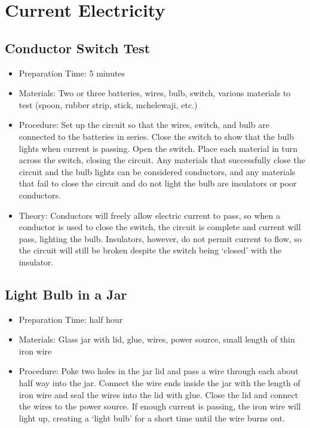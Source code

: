 \section{Current Electricity}

\subsection{Conductor Switch Test}
\begin{itemize}
\item{Preparation Time: 5 minutes}
\item{Materials: Two or three batteries, wires, bulb, switch, various materials to test (spoon, rubber strip, stick, mchelewaji, etc.)}
\item{Procedure: Set up the circuit so that the wires, switch, and bulb are connected to the batteries in series. Close the switch to show that the bulb lights when current is passing. Open the switch. Place each material in turn across the switch, closing the circuit. Any materials that successfully close the circuit and the bulb lights can be considered conductors, and any materials that fail to close the circuit and do not light the bulb are insulators or poor conductors.}
\item{Theory: Conductors will freely allow electric current to pass, so when a conductor is used to close the switch, the circuit is complete and current will pass, lighting the bulb. Insulators, however, do not permit current to flow, so the circuit will still be broken despite the switch being ‘closed’ with the insulator.}
\end{itemize}

\subsection{Light Bulb in a Jar}
\begin{itemize}
\item{Preparation Time: half hour}
\item{Materials: Glass jar with lid, glue, wires, power source, small length of thin iron wire}
\item{Procedure: Poke two holes in the jar lid and pass a wire through each about half way into the jar. Connect the wire ends inside the jar with the length of iron wire and seal the wires into the lid with glue. Close the lid and connect the wires to the power source. If enough current is passing, the iron wire will light up, creating a ‘light bulb’ for a short time until the wire burns out.}
\end{itemize}

